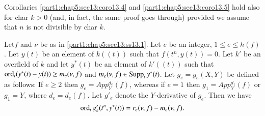 \begin{remark}\label{part1:chap5:sec13:rem13.6}
  Corollaries \ref{part1:chap5:sec13:coro13.4} and
  \ref{part1:chap5:sec13:coro13.5} hold also for char $k > 0$ (and, in
  fact, the same proof goes through) provided we assume that $n$ is
  not divisible by char $k$.
\end{remark}

\begin{prop}\label{part1:chap5:sec13:prop13.7}
  Let\pageoriginale $f$ and $\nu$ be as in \ref{part1:chap5:sec13:ss13.1}. Let $e$
  be an integer, $1 \leq e \leq h(f)$. Let $y(t)$ be an element of
  $k((t))$ such that $f(t^n, y(t))=0$. Let $k'$ be an overfield of $k$
  and let $y^*(t)$ be an element of $k'((t))$ such that $\operatorname{ord}_t(y^*
  (t)- y(t)) \geq m_e (\nu, f)$ and $m_e (\nu, f) \in \operatorname{Supp}_t y^*
  (t)$. Let $g_e = g_e (X, Y)$ be defined as follows: If $e\geq 2$
  then $g_e = App_Y^{d_e} (f)$, whereas if $e=1$ then $g_1 =
  App_Y^{d_1}(f)$ or $g_1 = Y$, where $d_e = d_e (f)$. Let $g'_e$
  denote the $Y$-derivative of $g_e$. Then we have
$$
\operatorname{ord}_t g'_e (t^n, y^* (t))= r_e (\nu, f)- m_e (\nu, f).
$$
\end{prop}

